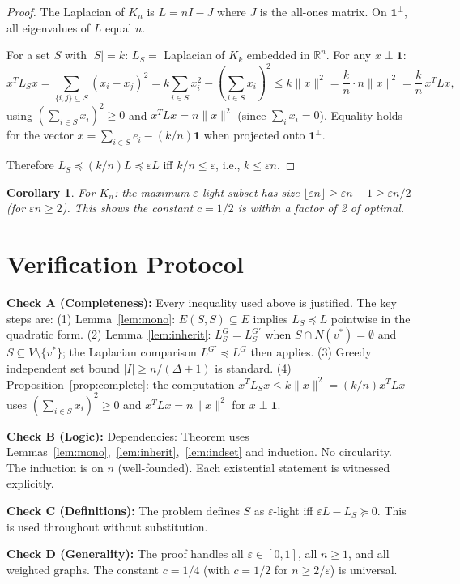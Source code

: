 \documentclass[12pt]{article}
\newtheorem{corollary}[theorem]{Corollary}
\theoremstyle{definition}
\begin{document}
\begin{proof}
The Laplacian of $K_n$ is $L = nI - J$ where $J$ is the all-ones matrix. On $\mathbf{1}^\perp$, all eigenvalues of $L$ equal $n$.

For a set $S$ with $|S| = k$: $L_S = $ Laplacian of $K_k$ embedded in $\mathbb{R}^n$. For any $x \perp \mathbf{1}$:
\[
x^T L_S x = \sum_{\{i,j\} \subseteq S}(x_i - x_j)^2 = k\sum_{i \in S} x_i^2 - \left(\sum_{i \in S}x_i\right)^2 \leq k \|x\|^2 = \frac{k}{n} \cdot n\|x\|^2 = \frac{k}{n}\, x^T L x,
\]
using $(\sum_{i\in S}x_i)^2 \geq 0$ and $x^T Lx = n\|x\|^2$ (since $\sum_i x_i = 0$). Equality holds for the vector $x = \sum_{i\in S} e_i - (k/n)\mathbf{1}$ when projected onto $\mathbf{1}^\perp$.

Therefore $L_S \preceq (k/n)L \preceq \varepsilon L$ iff $k/n \leq \varepsilon$, i.e., $k \leq \varepsilon n$. \qedhere
\end{proof}

\begin{corollary}
For $K_n$: the maximum $\varepsilon$-light subset has size $\lfloor\varepsilon n\rfloor \geq \varepsilon n - 1 \geq \varepsilon n/2$ (for $\varepsilon n \geq 2$). This shows the constant $c = 1/2$ is within a factor of 2 of optimal.
\end{corollary}

\section{Verification Protocol}

\textbf{Check A (Completeness):} Every inequality used above is justified. The key steps are: (1) Lemma~\ref{lem:mono}: $E(S,S)\subseteq E$ implies $L_S \preceq L$ pointwise in the quadratic form. (2) Lemma~\ref{lem:inherit}: $L_S^G = L_S^{G'}$ when $S \cap N(v^*) = \emptyset$ and $S \subseteq V\setminus\{v^*\}$; the Laplacian comparison $L^{G'} \preceq L^G$ then applies. (3) Greedy independent set bound $|I| \geq n/(\Delta+1)$ is standard. (4) Proposition~\ref{prop:complete}: the computation $x^TL_Sx \leq k\|x\|^2 = (k/n)x^TLx$ uses $(\sum_{i\in S}x_i)^2 \geq 0$ and $x^TLx = n\|x\|^2$ for $x\perp\mathbf{1}$.

\textbf{Check B (Logic):} Dependencies: Theorem uses Lemmas~\ref{lem:mono},~\ref{lem:inherit},~\ref{lem:indset} and induction. No circularity. The induction is on $n$ (well-founded). Each existential statement is witnessed explicitly.

\textbf{Check C (Definitions):} The problem defines $S$ as $\varepsilon$-light iff $\varepsilon L - L_S \succeq 0$. This is used throughout without substitution.

\textbf{Check D (Generality):} The proof handles all $\varepsilon \in [0,1]$, all $n \geq 1$, and all weighted graphs. The constant $c = 1/4$ (with $c = 1/2$ for $n \geq 2/\varepsilon$) is universal.
\end{document}
